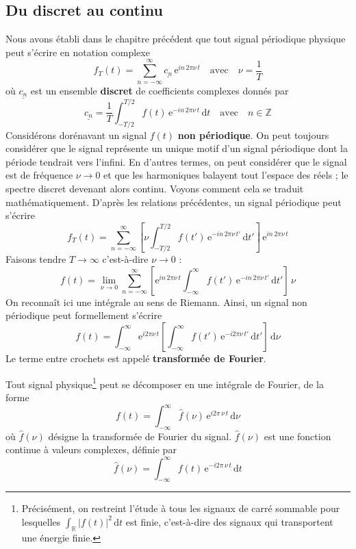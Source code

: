 \subsection{Du discret au continu} %
\label{sub:spectre_continu}
Nous avons établi dans le chapitre  précédent que tout signal périodique physique peut s'écrire en notation complexe
\[
f_T(t)=\sum_{n=-\infty}^\infty \underline{c_n}\,\mathrm{e}^{i n\,2\pi\nu\,t}
\quad\text{avec}\quad
\nu=\frac{1}{T}
\]
où \({\underline{c_n}}\) est un ensemble \textbf{discret} de coefficients complexes donnés par
\[
\underline{c_n}=\frac{1}{T}\int_{-T/2}^{T/2}f(t) \, \mathrm{e}^{-i n\,2\pi\nu\, t}\,\mathrm{d}t
\quad\text{avec}\quad n\in \mathbb{Z}
\]
Considérons dorénavant un signal \(f(t)\) \textbf{non périodique}. On peut toujours considérer que le signal représente un unique motif d'un signal périodique dont la période tendrait vers l'infini. En d'autres termes, on peut considérer que le signal est de fréquence \(\nu\to 0\) et que les harmoniques balayent tout l'espace des réels ; le spectre discret devenant alors continu. Voyons comment cela se traduit mathématiquement. D'après les relations précédentes, un signal périodique peut s'écrire
\[
f_T(t)=\sum_{n=-\infty}^\infty \left[
\nu\int_{-T/2}^{T/2}f(t')\,\mathrm{e}^{-i n\,2\pi\nu\,t'}\,\mathrm{d}t'\right]\,\mathrm{e}^{i n\,2\pi\nu\,t}
\]
Faisons tendre \(T\to \infty\) c'est-à-dire \(\nu\to 0\) :
\[
	f(t)=\lim_{\nu\to 0} \sum_{n=-\infty}^\infty \left[
	\mathrm{e}^{i n\,2\pi\nu\,t} \int_{-\infty}^{\infty}f(t')\,\mathrm{e}^{-i n\,2\pi\nu\, t'}\,\mathrm{d}t'\right]\, \nu
\]
On reconnaît ici une intégrale au sens de Riemann. Ainsi, un signal non périodique peut formellement s'écrire
\[
	f(t)=\int_{-\infty}^\infty \mathrm{e}^{i2\pi\nu\, t} \left[\int_{-\infty}^{\infty}f(t')\,\mathrm{e}^{-i2\pi\nu\,t'}\,\mathrm{d}t'\right]\, \mathrm{d}\nu
\]
Le terme entre crochets est appelé \textbf{transformée de Fourier}.

\begin{kaobox}[frametitle=Intégrale de Fourier]
Tout signal physique\footnote{Précisément, on restreint l'étude à tous les signaux de carré sommable pour lesquelles \(\int_{\mathbb{R}}|f(t)|^2\,\mathrm{d}t\) est finie, c'est-à-dire des signaux qui transportent une énergie finie.} peut se décomposer en une intégrale  de Fourier, de la forme
\begin{equation}
f(t)=\int_{-\infty}^\infty \widehat{f}(\nu)\,\mathrm{e}^{i2\pi\,\nu\, t}\,\mathrm{d}\nu
\label{TFinverse}
\end{equation}
où \(\widehat{f}(\nu)\) désigne la transformée de Fourier du signal. \(\widehat{f}(\nu)\) est une fonction continue à valeurs complexes, définie par
\begin{equation}
	\widehat{f}(\nu)=\int_{-\infty}^{\infty}f(t)\,\mathrm{e}^{-i2\pi\,\nu\,t}\,\mathrm{d}t
	\label{TF}
\end{equation}
\end{kaobox}

